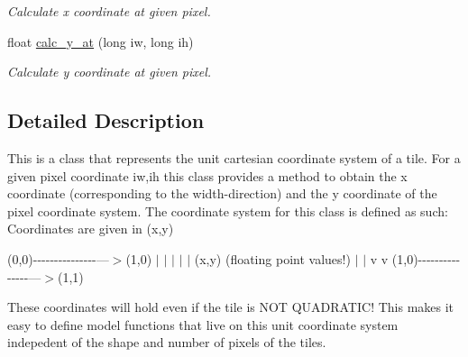 \begin{DoxyCompactItemize}
\begin{DoxyCompactList}\small\item\em Calculate x coordinate at given pixel. \end{DoxyCompactList}\item 
\hypertarget{classunit__cartesian__coordinate__system_ab45fbd73df0d1d3f4fe3bce0f65d2a8e}{float \hyperlink{classunit__cartesian__coordinate__system_ab45fbd73df0d1d3f4fe3bce0f65d2a8e}{calc\-\_\-y\-\_\-at} (long iw, long ih)}\label{classunit__cartesian__coordinate__system_ab45fbd73df0d1d3f4fe3bce0f65d2a8e}

\begin{DoxyCompactList}\small\item\em Calculate y coordinate at given pixel. \end{DoxyCompactList}\end{DoxyCompactItemize}


\subsection{Detailed Description}
This is a class that represents the unit cartesian coordinate system of a tile. For a given pixel coordinate iw,ih this class provides a method to obtain the x coordinate (corresponding to the width-\/direction) and the y coordinate of the pixel coordinate system. The coordinate system for this class is defined as such\-: Coordinates are given in (x,y)

(0,0)-\/-\/-\/-\/-\/-\/-\/-\/-\/-\/-\/-\/-\/-\/-\/---$>$(1,0) $\vert$ $\vert$ $\vert$ $\vert$ $\vert$ (x,y) (floating point values!) $\vert$ $\vert$ v v (1,0)-\/-\/-\/-\/-\/-\/-\/-\/-\/-\/-\/-\/-\/-\/-\/---$>$(1,1)
\begin{DoxyItemize}
\item These coordinates will hold even if the tile is N\-O\-T Q\-U\-A\-D\-R\-A\-T\-I\-C! This makes it easy to define model functions that live on this unit coordinate system indepedent of the shape and number of pixels of the tiles. 
\end{DoxyItemize}

